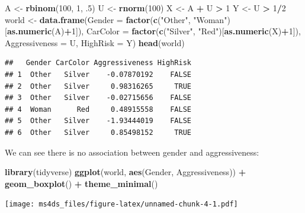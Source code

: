\documentclass[]{book}
\newenvironment{Shaded}{\begin{snugshade}}{\end{snugshade}}
\newcommand{\KeywordTok}[1]{\textcolor[rgb]{0.13,0.29,0.53}{\textbf{#1}}}
\newcommand{\DataTypeTok}[1]{\textcolor[rgb]{0.13,0.29,0.53}{#1}}
\newcommand{\DecValTok}[1]{\textcolor[rgb]{0.00,0.00,0.81}{#1}}
\newcommand{\StringTok}[1]{\textcolor[rgb]{0.31,0.60,0.02}{#1}}
\newcommand{\OperatorTok}[1]{\textcolor[rgb]{0.81,0.36,0.00}{\textbf{#1}}}
\newcommand{\NormalTok}[1]{#1}
\theoremstyle{definition}
\theoremstyle{definition}
\theoremstyle{definition}
\theoremstyle{remark}
\begin{document}
\begin{Shaded}
\begin{Highlighting}[]
\NormalTok{A <-}\StringTok{ }\KeywordTok{rbinom}\NormalTok{(}\DecValTok{100}\NormalTok{, }\DecValTok{1}\NormalTok{, .}\DecValTok{5}\NormalTok{)}
\NormalTok{U <-}\StringTok{ }\KeywordTok{rnorm}\NormalTok{(}\DecValTok{100}\NormalTok{)}
\NormalTok{X <-}\StringTok{ }\NormalTok{A }\OperatorTok{+}\StringTok{ }\NormalTok{U }\OperatorTok{>}\StringTok{ }\DecValTok{1}
\NormalTok{Y <-}\StringTok{ }\NormalTok{U }\OperatorTok{>}\StringTok{ }\DecValTok{1}\OperatorTok{/}\DecValTok{2}
\NormalTok{world <-}\StringTok{ }\KeywordTok{data.frame}\NormalTok{(}\DataTypeTok{Gender =} \KeywordTok{factor}\NormalTok{(}\KeywordTok{c}\NormalTok{(}\StringTok{"Other"}\NormalTok{, }\StringTok{"Woman"}\NormalTok{)[}\KeywordTok{as.numeric}\NormalTok{(A)}\OperatorTok{+}\DecValTok{1}\NormalTok{]),}
                    \DataTypeTok{CarColor =} \KeywordTok{factor}\NormalTok{(}\KeywordTok{c}\NormalTok{(}\StringTok{"Silver"}\NormalTok{, }\StringTok{"Red"}\NormalTok{)[}\KeywordTok{as.numeric}\NormalTok{(X)}\OperatorTok{+}\DecValTok{1}\NormalTok{]),}
                    \DataTypeTok{Aggressiveness =}\NormalTok{ U,}
                    \DataTypeTok{HighRisk =}\NormalTok{ Y)}
\KeywordTok{head}\NormalTok{(world)}
\end{Highlighting}
\end{Shaded}

\begin{verbatim}
##   Gender CarColor Aggressiveness HighRisk
## 1  Other   Silver    -0.07870192    FALSE
## 2  Other   Silver     0.98316265     TRUE
## 3  Other   Silver    -0.02715656    FALSE
## 4  Woman      Red     0.48915558    FALSE
## 5  Other   Silver    -1.93444019    FALSE
## 6  Other   Silver     0.85498152     TRUE
\end{verbatim}

We can see there is no association between gender and aggressiveness:

\begin{Shaded}
\begin{Highlighting}[]
\KeywordTok{library}\NormalTok{(tidyverse)}
\KeywordTok{ggplot}\NormalTok{(world, }\KeywordTok{aes}\NormalTok{(Gender, Aggressiveness)) }\OperatorTok{+}\StringTok{ }\KeywordTok{geom_boxplot}\NormalTok{() }\OperatorTok{+}\StringTok{ }\KeywordTok{theme_minimal}\NormalTok{()}
\end{Highlighting}
\end{Shaded}

\texttt{[image: ms4ds\_files/figure-latex/unnamed-chunk-4-1.pdf]}
\end{document}
